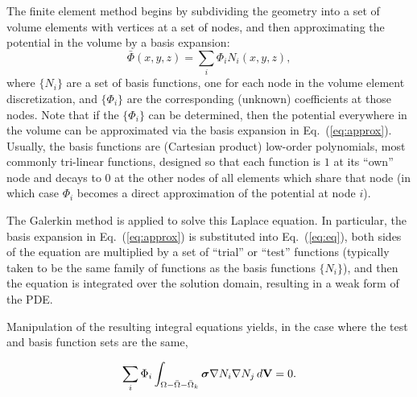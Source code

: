 \documentclass[fleqn,11pt,openany]{book}
\newcommand{\BM }[1]{\mbox{\boldmath $#1$}}
\begin{document}
The finite element method begins by subdividing the geometry into a set of
volume elements with vertices at a set of nodes, and then approximating
the potential in the volume by a basis expansion:
\begin{equation} \bar{\Phi}(x,y,z) = \sum_i \Phi_i
N_i(x,y,z), \label{eq:approx}
\end{equation}
\noindent where $\{N_i\}$ are a set of basis functions, one for each node in the
volume element discretization, and
$\{\Phi_i\}$ are the corresponding (unknown) coefficients at those nodes.
Note that if the
$\{\Phi_i\}$ can be determined, then the potential everywhere in the volume
can be approximated via the basis expansion in
Eq.~(\ref{eq:approx}). Usually, the basis functions are (Cartesian product)
low-order polynomials, most commonly tri-linear functions, designed so that
each function is $1$ at its ``own'' node and decays to $0$ at the other nodes of
all elements which share that node (in which case $\Phi_{i}$ becomes a
direct approximation of the potential at node $i$).


The Galerkin method is applied to solve this Laplace equation. In
particular, the basis expansion in Eq.~(\ref{eq:approx}) is substituted
into Eq.~(\ref{eq:eq}), both sides of the equation are multiplied by a set
of ``trial'' or ``test'' functions (typically taken to be the same family of
functions as the basis functions $\{N_{i}\}$), and then the equation is
integrated over the solution domain, resulting in a weak form of the
PDE.

Manipulation of the resulting integral equations yields, in the case where
the test and basis function sets are the same,

\begin{equation} \sum_i \Phi_i \int_{\Omega - \bar{\Omega} -
\bar{\Omega}_k} \BM{\sigma} \nabla N_i \nabla N_j \, d\mathbf{V} = 0. \label{eq:int_eq}
\end{equation}
\end{document}
